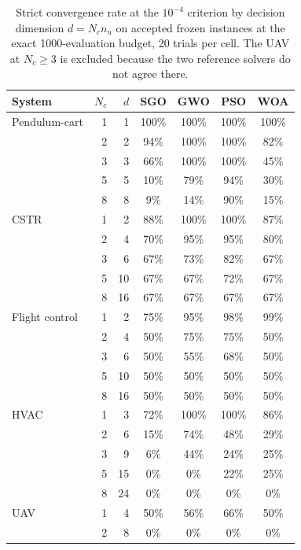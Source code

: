 \begin{table}[htbp]
\centering
\small
\caption{Strict convergence rate at the $10^{-4}$ criterion by decision dimension $d=N_c n_u$ on accepted frozen instances at the exact 1000-evaluation budget, 20 trials per cell. The UAV at $N_c\ge3$ is excluded because the two reference solvers do not agree there.}
\label{tab:dimgrid}
\begin{tabular}{@{}lrrcccc@{}}
\toprule
System & $N_c$ & $d$ & SGO & GWO & PSO & WOA \\
\midrule
Pendulum-cart & 1 & 1 & 100\% & 100\% & 100\% & 100\% \\
 & 2 & 2 & 94\% & 100\% & 100\% & 82\% \\
 & 3 & 3 & 66\% & 100\% & 100\% & 45\% \\
 & 5 & 5 & 10\% & 79\% & 94\% & 30\% \\
 & 8 & 8 & 9\% & 14\% & 90\% & 15\% \\
\addlinespace
CSTR & 1 & 2 & 88\% & 100\% & 100\% & 87\% \\
 & 2 & 4 & 70\% & 95\% & 95\% & 80\% \\
 & 3 & 6 & 67\% & 73\% & 82\% & 67\% \\
 & 5 & 10 & 67\% & 67\% & 72\% & 67\% \\
 & 8 & 16 & 67\% & 67\% & 67\% & 67\% \\
\addlinespace
Flight control & 1 & 2 & 75\% & 95\% & 98\% & 99\% \\
 & 2 & 4 & 50\% & 75\% & 75\% & 50\% \\
 & 3 & 6 & 50\% & 55\% & 68\% & 50\% \\
 & 5 & 10 & 50\% & 50\% & 50\% & 50\% \\
 & 8 & 16 & 50\% & 50\% & 50\% & 50\% \\
\addlinespace
HVAC & 1 & 3 & 72\% & 100\% & 100\% & 86\% \\
 & 2 & 6 & 15\% & 74\% & 48\% & 29\% \\
 & 3 & 9 & 6\% & 44\% & 24\% & 25\% \\
 & 5 & 15 & 0\% & 0\% & 22\% & 25\% \\
 & 8 & 24 & 0\% & 0\% & 0\% & 0\% \\
\addlinespace
UAV & 1 & 4 & 50\% & 56\% & 66\% & 50\% \\
 & 2 & 8 & 0\% & 0\% & 0\% & 0\% \\
\bottomrule
\end{tabular}
\end{table}
